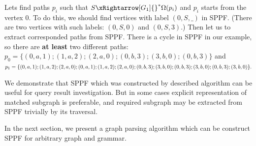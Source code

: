 Lets find paths $p_i$ such that $S {\xRightarrow[G_1]{}}^{*} \Omega(p_i)$ and $p_i$ starts from the vertex $0$.
To do this, we should find vertices with label $(0, S, \_)$ in SPPF.
(There are two vertices with such labels: $(0, S, 0)$ and $(0, S, 3)$.)
Then let us to extract corresponded paths from SPPF.
There is a cycle in SPPF in our example, so there are \textbf{at least} two different paths: $p_0=\{(0,a,1);(1,a,2);(2,a,0);(0,b,3);(3,b,0);(0,b,3)\}$ and 
$
p_1=\{(0,a,1);(1,a,2);(2,a,0);(0,a,1);(1,a,2);(2,a,0);(0,b,3);(3,b,0);(0,b,3);\\(3,b,0);(0,b,3);(3,b,0)\}.
$

We demonstrate that SPPF which was constructed by described algorithm can be useful for query result investigation. 
But in some cases explicit representation of matched subgraph is preferable, and required subgraph may be extracted from SPPF trivially by its traversal.

In the next section, we present a graph parsing algorithm which can be construct SPPF for arbitrary graph and grammar.